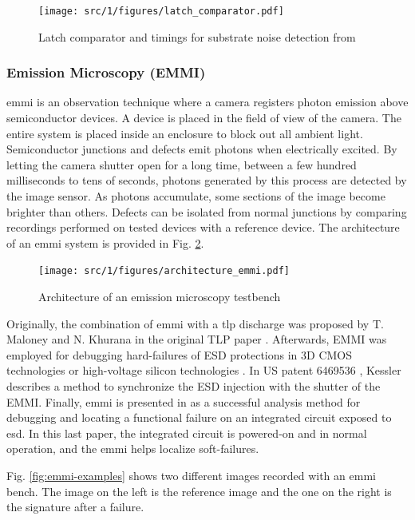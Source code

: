 \begin{figure}[!h]
  \centering
  \texttt{[image: src/1/figures/latch\_comparator.pdf]}
  \caption{Latch comparator and timings for substrate noise detection from \cite{}}
  \label{fig:noise-detect-latch-comparator}
\end{figure}

\subsubsection{Emission Microscopy (EMMI)}

\gls{emmi} is an observation technique where a camera registers photon emission above semiconductor devices.
A device is placed in the field of view of the camera.
The entire system is placed inside an enclosure to block out all ambient light.
Semiconductor junctions and defects emit photons when electrically excited.
By letting the camera shutter open for a long time, between a few hundred milliseconds to tens of seconds, photons generated by this process are detected by the image sensor.
As photons accumulate, some sections of the image become brighter than others.
Defects can be isolated from normal junctions by comparing recordings performed on tested devices with a reference device.
The architecture of an \gls{emmi} system is provided in Fig. \ref{fig:emmi}.

\begin{figure}[!h]
  \centering
  \texttt{[image: src/1/figures/architecture\_emmi.pdf]}
  \caption{Architecture of an emission microscopy testbench}
  \label{fig:emmi}
\end{figure}

Originally, the combination of \gls{emmi} with a \gls{tlp} discharge was proposed by T. Maloney and N. Khurana in the original TLP paper \cite{TLP}.
Afterwards, EMMI was employed for debugging hard-failures of ESD protections in 3D CMOS technologies \cite{kessler2002method} or high-voltage silicon technologies \cite{emmi-tlp}.
In US patent 6469536 \cite{kessler2002method}, Kessler describes a method to synchronize the ESD injection with the shutter of the EMMI.
Finally, \gls{emmi} is presented in \cite{softfailEMMI} as a successful analysis method for debugging and locating a functional failure on an integrated circuit exposed to \gls{esd}.
In this last paper, the integrated circuit is powered-on and in normal operation, and the \gls{emmi} helps localize soft-failures.

Fig. \ref{fig:emmi-examples} shows two different images recorded with an \gls{emmi} bench.
The image on the left is the reference image and the one on the right is the signature after a failure.


